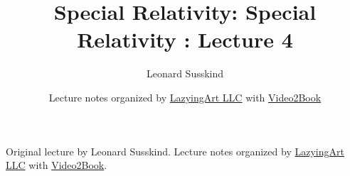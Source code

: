\documentclass[11pt,oneside]{book}
\begin{document}
\frontmatter
\title{Special Relativity: Special Relativity : Lecture 4}
\author{Leonard Susskind}
\date{Lecture notes organized by \href{https://lazying.art}{LazyingArt LLC} with \href{https://github.com/lachlanchen/Video2Book}{Video2Book}}
\maketitle
\begin{center}
\small Original lecture by Leonard Susskind. Lecture notes organized by \href{https://lazying.art}{LazyingArt LLC} with \href{https://github.com/lachlanchen/Video2Book}{Video2Book}.
\end{center}
\clearpage
\mainmatter

\end{document}
